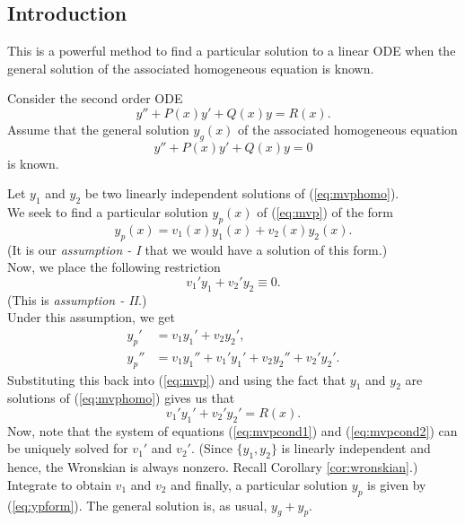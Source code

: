 \subsection{Introduction}
This is a powerful method to find a particular solution to a linear ODE when the general solution of the associated homogeneous equation is known.
\begin{mdframed}[style=boxstyle, frametitle={The Setup}]
	Consider the second order ODE 
	\begin{equation} \label{eq:mvp}
		y'' + P(x)y' + Q(x)y = R(x).
	\end{equation}
	Assume that the general solution $y_g(x)$ of the associated homogeneous equation
	\begin{equation} \label{eq:mvphomo}
		y'' + P(x)y' + Q(x)y = 0
	\end{equation}
	is known.
\end{mdframed}
\begin{mdframed}[style=boxstyle2, frametitle={The Solution - derivation. (Can be ignored.)}]
	Let $y_1$ and $y_2$ be two linearly independent solutions of (\ref{eq:mvphomo}).\\
	We seek to find a particular solution $y_p(x)$ of (\ref{eq:mvp}) of the form
	\begin{equation} \label{eq:ypform}
		y_p(x) = v_1(x)y_1(x) + v_2(x)y_2(x).
	\end{equation}
	(It is our \emph{assumption - I} that we would have a solution of this form.)\\
	Now, we place the following restriction
	\begin{equation} \label{eq:mvpcond1}
		v_1'y_1 + v_2'y_2 \equiv 0.
	\end{equation}
	(This is \emph{assumption - II}.)\\
	Under this assumption, we get 
	\begin{align*} 
		y_p' &= v_1y_1' + v_2y_2',\\
		y_p'' &= v_1y_1'' + v_1'y_1' + v_2y_2''+ v_2'y_2'.
	\end{align*}
	Substituting this back into (\ref{eq:mvp}) and using the fact that $y_1$ and $y_2$ are solutions of (\ref{eq:mvphomo}) gives us that
	\begin{equation} \label{eq:mvpcond2}
		v_1'y_1' + v_2'y_2' = R(x).
	\end{equation}
	Now, note that the system of equations (\ref{eq:mvpcond1}) and (\ref{eq:mvpcond2}) can be uniquely solved for $v_1'$ and $v_2'$. (Since $\{y_1, y_2\}$ is linearly independent and hence, the Wronskian is always nonzero. Recall Corollary \ref{cor:wronskian}.)\\
	Integrate to obtain $v_1$ and $v_2$ and finally, a particular solution $y_p$ is given by (\ref{eq:ypform}). The general solution is, as usual, $y_g + y_p.$
\end{mdframed}

